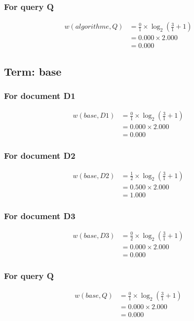 \documentclass{article}
\begin{document}
\subsubsection*{For query Q}
\begin{align}
w(algorithme, Q) &= \frac{0}{1} \times \log_{2}\left(\frac{3}{1} + 1\right) \\
&= 0.000 \times 2.000 \\
&= 0.000
\end{align}

\subsection{Term: base}
\subsubsection*{For document D1}
\begin{align}
w(base, D1) &= \frac{0}{1} \times \log_{2}\left(\frac{3}{1} + 1\right) \\
&= 0.000 \times 2.000 \\
&= 0.000
\end{align}

\subsubsection*{For document D2}
\begin{align}
w(base, D2) &= \frac{1}{2} \times \log_{2}\left(\frac{3}{1} + 1\right) \\
&= 0.500 \times 2.000 \\
&= 1.000
\end{align}

\subsubsection*{For document D3}
\begin{align}
w(base, D3) &= \frac{0}{2} \times \log_{2}\left(\frac{3}{1} + 1\right) \\
&= 0.000 \times 2.000 \\
&= 0.000
\end{align}

\subsubsection*{For query Q}
\begin{align}
w(base, Q) &= \frac{0}{1} \times \log_{2}\left(\frac{3}{1} + 1\right) \\
&= 0.000 \times 2.000 \\
&= 0.000
\end{align}
\end{document}
